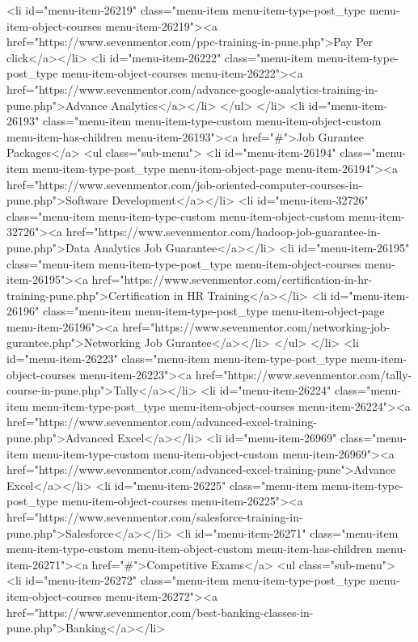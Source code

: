 {<li id="menu-item-26219" class="menu-item menu-item-type-post_type menu-item-object-courses menu-item-26219"><a href="https://www.sevenmentor.com/ppc-training-in-pune.php">Pay Per click</a></li>
<li id="menu-item-26222" class="menu-item menu-item-type-post_type menu-item-object-courses menu-item-26222"><a href="https://www.sevenmentor.com/advance-google-analytics-training-in-pune.php">Advance Analytics</a></li>
</ul>
</li>
<li id="menu-item-26193" class="menu-item menu-item-type-custom menu-item-object-custom menu-item-has-children menu-item-26193"><a href="#">Job Gurantee Packages</a>
<ul class="sub-menu">
<li id="menu-item-26194" class="menu-item menu-item-type-post_type menu-item-object-page menu-item-26194"><a href="https://www.sevenmentor.com/job-oriented-computer-courses-in-pune.php">Software Development</a></li>
<li id="menu-item-32726" class="menu-item menu-item-type-custom menu-item-object-custom menu-item-32726"><a href="https://www.sevenmentor.com/hadoop-job-guarantee-in-pune.php">Data Analytics Job Guarantee</a></li>
<li id="menu-item-26195" class="menu-item menu-item-type-post_type menu-item-object-courses menu-item-26195"><a href="https://www.sevenmentor.com/certification-in-hr-training-pune.php">Certification in HR Training</a></li>
<li id="menu-item-26196" class="menu-item menu-item-type-post_type menu-item-object-page menu-item-26196"><a href="https://www.sevenmentor.com/networking-job-gurantee.php">Networking Job Gurantee</a></li>
</ul>
</li>
<li id="menu-item-26223" class="menu-item menu-item-type-post_type menu-item-object-courses menu-item-26223"><a href="https://www.sevenmentor.com/tally-course-in-pune.php">Tally</a></li>
<li id="menu-item-26224" class="menu-item menu-item-type-post_type menu-item-object-courses menu-item-26224"><a href="https://www.sevenmentor.com/advanced-excel-training-pune.php">Advanced Excel</a></li>
<li id="menu-item-26969" class="menu-item menu-item-type-custom menu-item-object-custom menu-item-26969"><a href="https://www.sevenmentor.com/advanced-excel-training-pune">Advance Excel</a></li>
<li id="menu-item-26225" class="menu-item menu-item-type-post_type menu-item-object-courses menu-item-26225"><a href="https://www.sevenmentor.com/salesforce-training-in-pune.php">Salesforce</a></li>
<li id="menu-item-26271" class="menu-item menu-item-type-custom menu-item-object-custom menu-item-has-children menu-item-26271"><a href="#">Competitive Exams</a>
<ul class="sub-menu">
<li id="menu-item-26272" class="menu-item menu-item-type-post_type menu-item-object-courses menu-item-26272"><a href="https://www.sevenmentor.com/best-banking-classes-in-pune.php">Banking</a></li>
}
